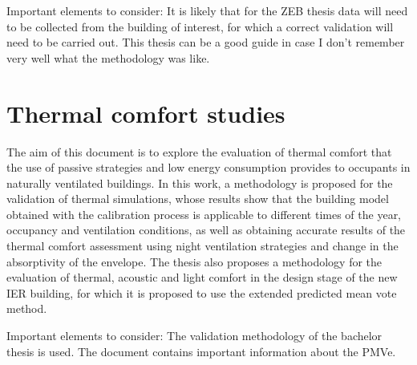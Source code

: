 Important elements to consider: It is likely that for the ZEB thesis data will need to be collected from the building of interest, for which a correct validation will need to be carried out. This thesis can be a good guide in case I don't remember very well what the methodology was like.


\section{Thermal comfort studies}

The aim of this document is to explore the evaluation of thermal comfort that the use of passive strategies and low energy consumption provides to occupants in naturally ventilated buildings. In this work, a methodology is proposed for the validation of thermal simulations, whose results show that the building model obtained with the calibration process is applicable to different times of the year, occupancy and ventilation conditions, as well as obtaining accurate results of the thermal comfort assessment using night ventilation strategies and change in the absorptivity of the envelope. The thesis also proposes a methodology for the evaluation of thermal, acoustic and light comfort in the design stage of the new IER building, for which it is proposed to use the extended predicted mean vote method.


Important elements to consider: The validation methodology of the bachelor thesis is used. The document contains important information about the PMVe.



